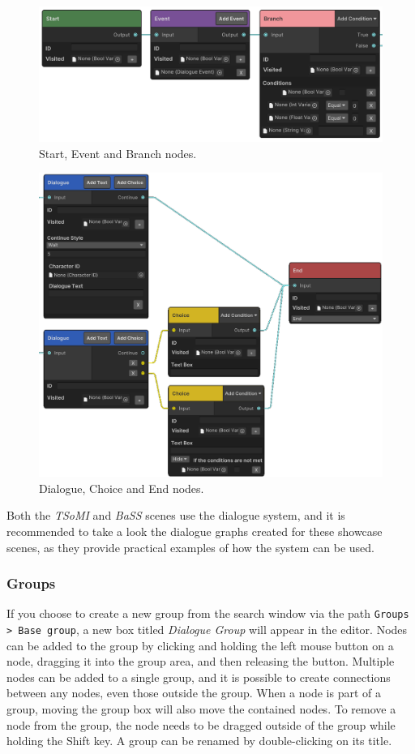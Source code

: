 \begin{figure}[H]
\centering
\includegraphics[width=1\linewidth]{img/User doc/nodes1.png}
\caption{Start, Event and Branch nodes.}
\label{fig:Manual-Nodes1}
\end{figure}
\begin{figure}[H]
\centering
\includegraphics[width=1\linewidth]{img/User doc/nodes2.png}
\caption{Dialogue, Choice and End nodes.}
\label{fig:Manual-Nodes2}
\end{figure}

Both the \textit{TSoMI} and \textit{BaSS} scenes use the dialogue system, and it is recommended to take a look the dialogue graphs created for these showcase scenes, as they provide practical examples of how the system can be used. 

\subsubsection{Groups}
If you choose to create a new group from the search window via the path \verb|Groups > Base group|, a new box titled \textit{Dialogue Group} will appear in the editor. Nodes can be added to the group by clicking and holding the left mouse button on a node, dragging it into the group area, and then releasing the button. Multiple nodes can be added to a single group, and it is possible to create connections between any nodes, even those outside the group. When a node is part of a group, moving the group box will also move the contained nodes. To remove a node from the group, the node needs to be dragged outside of the group while holding the Shift key. A group can be renamed by double-clicking on its title. 

